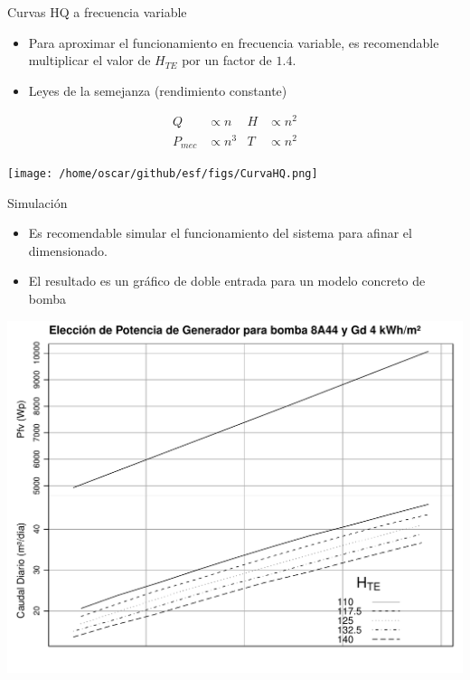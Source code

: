 \documentclass[xcolor={usenames,svgnames,dvipsnames}]{beamer}
\begin{document}
\begin{frame}[label={sec:orgd66ddf2}]{Curvas HQ a frecuencia variable}
\begin{itemize}
\item Para aproximar el funcionamiento en frecuencia variable, es recomendable \alert{multiplicar el valor de \(H_{TE}\) por un factor de \(1.4\)}.

\item Leyes de la semejanza (rendimiento constante)
\end{itemize}

\begin{align*}
Q &\propto n &H &\propto n^{2}\\
P_{mec} &\propto n^{3} &T &\propto n^{2}
\end{align*}

\begin{center}
\texttt{[image: /home/oscar/github/esf/figs/CurvaHQ.png]}
\end{center}
\end{frame}



\begin{frame}[label={sec:org942efed}]{Simulación}
\begin{itemize}
\item Es recomendable simular el funcionamiento del sistema para afinar el dimensionado.
\item El resultado es un gráfico de doble entrada para un modelo concreto de bomba
\end{itemize}
\begin{center}
\includegraphics[width=.9\linewidth]{../figs/AbacoBomba.pdf}
\end{center}
\end{frame}
\end{document}
